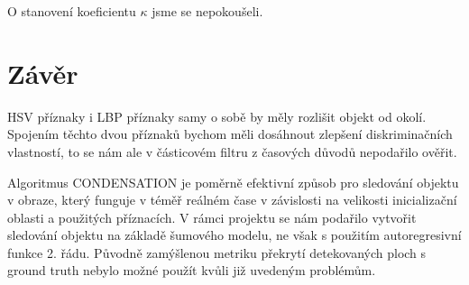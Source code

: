 \documentclass[12pt]{article}
\begin{document}
O stanovení koeficientu $\kappa$ jsme se nepokoušeli.

\section{Závěr}
HSV příznaky i LBP příznaky samy o sobě by měly rozlišit objekt od okolí. Spojením těchto dvou příznaků bychom měli dosáhnout zlepšení diskriminačních vlastností, to se nám ale v částicovém filtru z časových důvodů nepodařilo ověřit.

Algoritmus CONDENSATION je poměrně efektivní způsob pro sledování objektu v obraze, který funguje v téměř reálném čase v závislosti na velikosti inicializační oblasti a použitých příznacích. V rámci projektu se nám podařilo vytvořit sledování objektu na základě šumového modelu, ne však s použitím autoregresivní funkce 2. řádu. Původně zamýšlenou metriku překrytí detekovaných ploch s ground truth nebylo možné použít kvůli již uvedeným problémům.

\begin{flushleft}
  
\end{flushleft}

\end{document}
